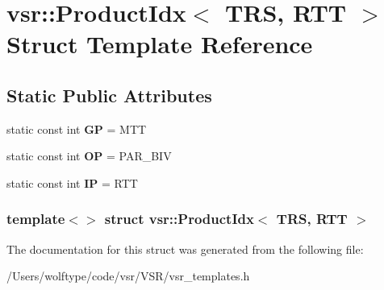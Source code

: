 \hypertarget{structvsr_1_1_product_idx_3_01_t_r_s_00_01_r_t_t_01_4}{\section{vsr\-:\-:Product\-Idx$<$ T\-R\-S, R\-T\-T $>$ Struct Template Reference}
\label{structvsr_1_1_product_idx_3_01_t_r_s_00_01_r_t_t_01_4}
}
\subsection*{Static Public Attributes}
\begin{DoxyCompactItemize}
\item 
\hypertarget{structvsr_1_1_product_idx_3_01_t_r_s_00_01_r_t_t_01_4_a8e218f39913790099acc95901c027bf7}{static const int {\bfseries G\-P} = M\-T\-T}\label{structvsr_1_1_product_idx_3_01_t_r_s_00_01_r_t_t_01_4_a8e218f39913790099acc95901c027bf7}

\item 
\hypertarget{structvsr_1_1_product_idx_3_01_t_r_s_00_01_r_t_t_01_4_a46d0c8f0748f9673605664f6915472b7}{static const int {\bfseries O\-P} = P\-A\-R\-\_\-\-B\-I\-V}\label{structvsr_1_1_product_idx_3_01_t_r_s_00_01_r_t_t_01_4_a46d0c8f0748f9673605664f6915472b7}

\item 
\hypertarget{structvsr_1_1_product_idx_3_01_t_r_s_00_01_r_t_t_01_4_aa406692a4ff619c3def3e8cf3358beba}{static const int {\bfseries I\-P} = R\-T\-T}\label{structvsr_1_1_product_idx_3_01_t_r_s_00_01_r_t_t_01_4_aa406692a4ff619c3def3e8cf3358beba}

\end{DoxyCompactItemize}
\subsubsection*{template$<$$>$ struct vsr\-::\-Product\-Idx$<$ T\-R\-S, R\-T\-T $>$}



The documentation for this struct was generated from the following file\-:\begin{DoxyCompactItemize}
\item 
/\-Users/wolftype/code/vsr/\-V\-S\-R/vsr\-\_\-templates.\-h\end{DoxyCompactItemize}
